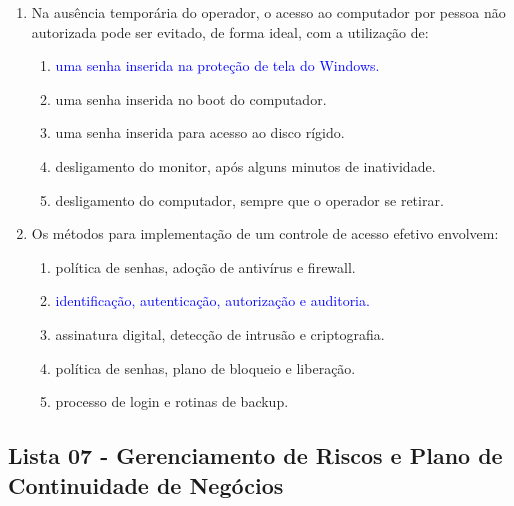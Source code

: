 \documentclass{report}
\begin{document}
\begin{enumerate}
		\item Na ausência temporária do operador, o acesso ao computador por pessoa não autorizada pode ser evitado, de forma ideal, com a utilização de:
		\begin{enumerate}[label=(\alph*)]
			\item \textcolor{blue}{uma senha inserida na proteção de tela do Windows.}
			\item uma senha inserida no boot do computador.
			\item uma senha inserida para acesso ao disco rígido.
			\item desligamento do monitor, após alguns minutos de inatividade.
			\item desligamento do computador, sempre que o operador se retirar.
		\end{enumerate}
		
		\item Os métodos para implementação de um controle de acesso efetivo envolvem:
		\begin{enumerate}[label=(\alph*)]
			\item política de senhas, adoção de antivírus e firewall.
			\item \textcolor{blue}{identificação, autenticação, autorização e auditoria.}
			\item assinatura digital, detecção de intrusão e criptografia.
			\item política de senhas, plano de bloqueio e liberação.
			\item processo de login e rotinas de backup.
		\end{enumerate}
		
	\end{enumerate}
	
	
	
	
	
	
	
	
	
	
	\subsection{Lista 07 - Gerenciamento de Riscos e Plano de Continuidade de Negócios}
	
\end{document}
